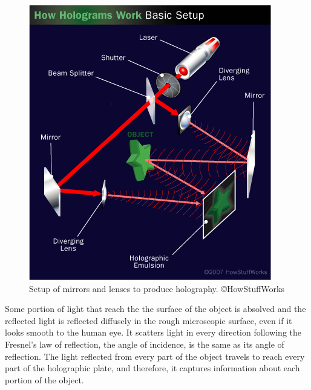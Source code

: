 \begin{figure}[!ht]
\centering
\includegraphics[width=0.9\linewidth,keepaspectratio=true]{figs/hologram-17.png}
\caption{Setup of mirrors and lenses to produce holography. ©HowStuffWorks}
\label{fig:setup}
\end{figure}

Some portion of light that reach the the surface of the object is absolved and the reflected light is reflected 
diffusely in the rough microscopic surface, even if it looks smooth to the human eye. It scatters light in every direction following the Fresnel's law of reflection, the angle of incidence, is the same as its angle of reflection. The light reflected from every part of the object travels to reach every part of the holographic plate, and therefore, it captures information about each portion of the object.



